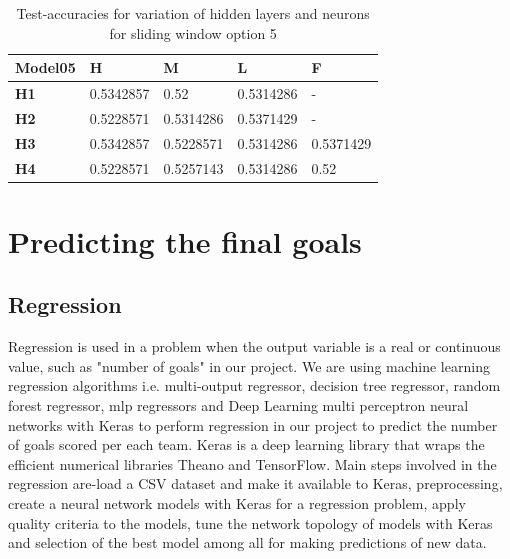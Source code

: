 \begin{table}
\centering
\begin{tabular}{|l|l|l|l|l|}
\hline

\textbf{Model05} & \textbf{H} & \textbf{M} & \textbf{L} & \textbf{F} \\ \hline
\textbf{H1} & 0.5342857 & 0.52 & 0.5314286 & - \\ \hline
\textbf{H2} & 0.5228571 & 0.5314286 & 0.5371429 & - \\ \hline
\textbf{H3} & 0.5342857 & 0.5228571 & 0.5314286 & 0.5371429 \\ \hline
\textbf{H4} & 0.5228571 & 0.5257143 & 0.5314286 & 0.52 \\ \hline

\end{tabular}
\caption{Test-accuracies for variation of hidden layers and neurons for sliding window option 5}
\label{table:nn_variation_sliding_05}
\end{table}

\section{Predicting the final goals}
\subsection{Regression}
Regression is used in a problem when the output variable is a real or continuous value, such as "number of goals" in our project. We are using machine learning regression algorithms i.e. multi-output regressor, decision tree regressor, random forest regressor, mlp regressors and Deep Learning multi perceptron neural networks with Keras to perform regression in our project to predict the number of goals scored per each team. Keras is a deep learning library that wraps the efficient numerical libraries Theano and TensorFlow. Main steps involved in the regression are-load a CSV dataset and make it available to Keras, preprocessing, create a neural network models with Keras for a regression problem, apply quality criteria to the models, tune the network topology of models with Keras and selection of the best model among all for making predictions of new data. 
